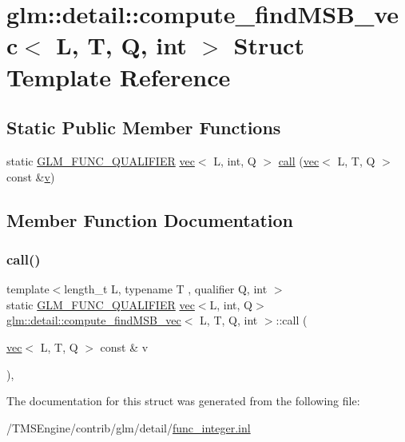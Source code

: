 \hypertarget{structglm_1_1detail_1_1compute__find_m_s_b__vec}{}\section{glm\+:\+:detail\+:\+:compute\+\_\+find\+M\+S\+B\+\_\+vec$<$ L, T, Q, int $>$ Struct Template Reference}
\label{structglm_1_1detail_1_1compute__find_m_s_b__vec}
\subsection*{Static Public Member Functions}
\begin{DoxyCompactItemize}
\item 
static \hyperlink{setup_8hpp_a33fdea6f91c5f834105f7415e2a64407}{G\+L\+M\+\_\+\+F\+U\+N\+C\+\_\+\+Q\+U\+A\+L\+I\+F\+I\+ER} \hyperlink{structglm_1_1vec}{vec}$<$ L, int, Q $>$ \hyperlink{structglm_1_1detail_1_1compute__find_m_s_b__vec_ab74bbcc16dd3f900d14de395a4689dbb}{call} (\hyperlink{structglm_1_1vec}{vec}$<$ L, T, Q $>$ const \&\hyperlink{_s_d_l__opengl_8h_a10a82eabcb59d2fcd74acee063775f90}{v})
\end{DoxyCompactItemize}


\subsection{Member Function Documentation}
\mbox{\label{structglm_1_1detail_1_1compute__find_m_s_b__vec_ab74bbcc16dd3f900d14de395a4689dbb}} 
\subsubsection{\texorpdfstring{call()}{call()}}
{\footnotesize\ttfamily template$<$length\+\_\+t L, typename T , qualifier Q, int $>$ \\
static \hyperlink{setup_8hpp_a33fdea6f91c5f834105f7415e2a64407}{G\+L\+M\+\_\+\+F\+U\+N\+C\+\_\+\+Q\+U\+A\+L\+I\+F\+I\+ER} \hyperlink{structglm_1_1vec}{vec}$<$L, int, Q$>$ \hyperlink{structglm_1_1detail_1_1compute__find_m_s_b__vec}{glm\+::detail\+::compute\+\_\+find\+M\+S\+B\+\_\+vec}$<$ L, T, Q, int $>$\+::call (\begin{DoxyParamCaption}\item[{\hyperlink{structglm_1_1vec}{vec}$<$ L, T, Q $>$ const \&}]{v }\end{DoxyParamCaption})\hspace{0.3cm}{\ttfamily [inline]}, {\ttfamily [static]}}



The documentation for this struct was generated from the following file\+:\begin{DoxyCompactItemize}
\item 
/\+T\+M\+S\+Engine/contrib/glm/detail/\hyperlink{func__integer_8inl}{func\+\_\+integer.\+inl}\end{DoxyCompactItemize}
